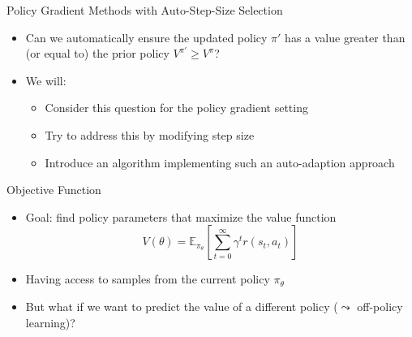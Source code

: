 \documentclass[aspectratio=169]{../latex_main/tntbeamer}  %
\begin{document}
\begin{frame}[c]{Policy Gradient Methods with Auto-Step-Size Selection}
	
    \begin{itemize}
        \item Can we automatically ensure the updated policy $\pi'$ has a value greater than (or equal to) the prior policy $V^{\pi'} \geq V^\pi$?
        \item We will:
        \begin{itemize}
            \item Consider this question for the policy gradient setting
            \item Try to address this by modifying step size
            \item Introduce an algorithm implementing such an auto-adaption approach
        \end{itemize}
    \end{itemize}

\end{frame}
\begin{frame}[c]{Objective Function}
	
    \begin{itemize}
        \item Goal: find policy parameters that maximize the value function
        $$ V(\theta) = \mathbb{E}_{\pi_\theta} \left[ \sum_{t=0}^{\infty} \gamma^t r(s_t, a_t) \right]$$
        \item Having access to samples from the current policy $\pi_\theta$ 
        \item But what if we want to predict the value of a different policy ($\leadsto$ off-policy learning)?
    \end{itemize}

\end{frame}
\end{document}
